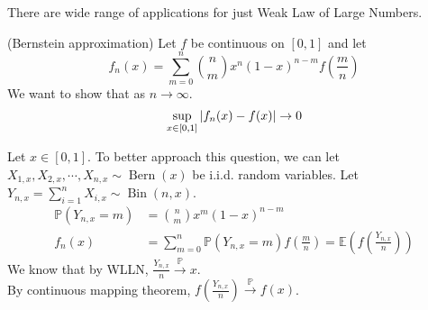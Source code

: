 \documentclass{huhtakm-template-book}
\newcommand{\prob}{\mathbb{P}}
\newcommand{\expect}{\mathbb{E}}
\DeclareMathOperator{\Bern}{Bern}
\DeclareMathOperator{\Bin}{Bin}
\begin{document}
\newpage
There are wide range of applications for just Weak Law of Large Numbers.
\begin{eg}(Bernstein approximation)
	Let $f$ be continuous on $[0,1]$ and let
	\begin{equation*}
		\tag{Bernstein polynomial}
		f_{n}(x)=\sum_{m=0}^{n}\binom{n}{m}x^{n}(1-x)^{n-m}f\left(\frac{m}{n}\right)
	\end{equation*}
	We want to show that as $n\to\infty$.
	\begin{equation*}
		\sup_{x\in[0,1]}\left|{f_{n}(x)-f(x)}\right|\to 0
	\end{equation*}
\end{eg}
\begin{rem}
	Let $x\in[0,1]$. To better approach this question, we can let $X_{1,x},X_{2,x},\cdots,X_{n,x}\sim\Bern(x)$ be i.i.d. random variables. Let $Y_{n,x}=\sum_{i=1}^{n}X_{i,x}\sim\Bin(n,x)$.
	\begin{align*}
		\prob(Y_{n,x}=m)&=\binom{n}{m}x^{m}(1-x)^{n-m}\\
		f_{n}(x)&=\sum_{m=0}^{n}\prob(Y_{n,x}=m)f\left(\frac{m}{n}\right)=\expect\left(f\left(\frac{Y_{n,x}}{n}\right)\right)
	\end{align*}
	We know that by WLLN, $\frac{Y_{n,x}}{n}\xrightarrow{\prob}x$.\\
	By continuous mapping theorem, $f\left(\frac{Y_{n,x}}{n}\right)\xrightarrow{\prob}f(x)$.
\end{rem}
\end{document}
